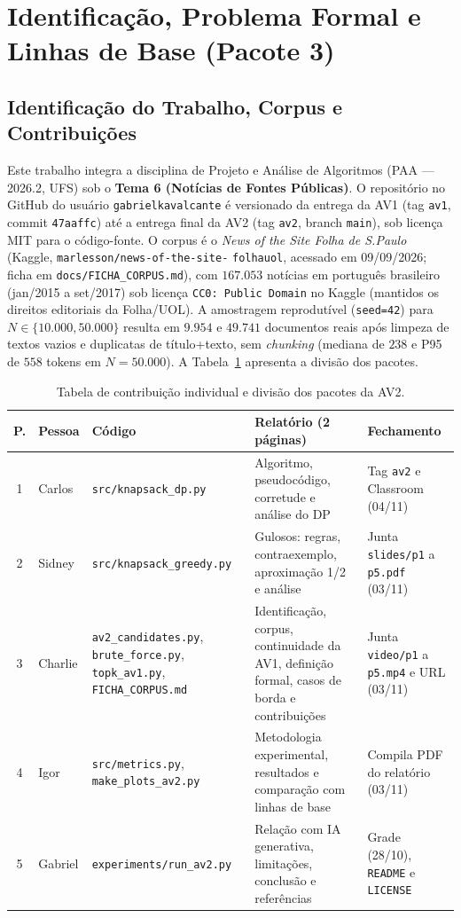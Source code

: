 \section{Identificação, Problema Formal e Linhas de Base (Pacote 3)}
\label{sec:pacote3}

\subsection{Identificação do Trabalho, Corpus e Contribuições}
Este trabalho integra a disciplina de Projeto e Análise de Algoritmos (PAA --- 2026.2, UFS) sob o \textbf{Tema 6 (Notícias de Fontes Públicas)}. O repositório no GitHub do usuário \texttt{gabrielkavalcante} é versionado da entrega da AV1 (tag \texttt{av1}, commit \texttt{47aaffc}) até a entrega final da AV2 (tag \texttt{av2}, branch \texttt{main}), sob licença MIT para o código-fonte. O corpus é o \emph{News of the Site Folha de S.Paulo} (Kaggle, \texttt{marlesson/news-of-the-site-} \texttt{folhauol}, acessado em 09/09/2026; ficha em \texttt{docs/FICHA\_CORPUS.md}), com $167.053$ notícias em português brasileiro (jan/2015 a set/2017) sob licença \texttt{CC0: Public Domain} no Kaggle (mantidos os direitos editoriais da Folha/UOL). A amostragem reprodutível (\texttt{seed=42}) para $N \in \{10.000, 50.000\}$ resulta em $9.954$ e $49.741$ documentos reais após limpeza de textos vazios e duplicatas de título+texto, sem \emph{chunking} (mediana de $238$ e P95 de $558$ tokens em $N=50.000$). A Tabela~\ref{tab:contribuicoes_av2} apresenta a divisão dos pacotes.

\begin{table}[h]
\centering
\scriptsize
\caption{Tabela de contribuição individual e divisão dos pacotes da AV2.}
\label{tab:contribuicoes_av2}
\begin{tabular}{clp{3.6cm}p{4.4cm}p{2.6cm}}
\toprule
\textbf{P.} & \textbf{Pessoa} & \textbf{Código} & \textbf{Relatório (2 páginas)} & \textbf{Fechamento} \\
\midrule
1 & Carlos & \texttt{src/knapsack\_dp.py} & Algoritmo, pseudocódigo, corretude e análise do DP & Tag \texttt{av2} e Classroom (04/11) \\
2 & Sidney & \texttt{src/knapsack\_greedy.py} & Gulosos: regras, contraexemplo, aproximação 1/2 e análise & Junta \texttt{slides/p1} a \texttt{p5.pdf} (03/11) \\
3 & Charlie & \texttt{av2\_candidates.py}, \texttt{brute\_force.py}, \texttt{topk\_av1.py}, \texttt{FICHA\_CORPUS.md} & Identificação, corpus, continuidade da AV1, definição formal, casos de borda e contribuições & Junta \texttt{video/p1} a \texttt{p5.mp4} e URL (03/11) \\
4 & Igor & \texttt{src/metrics.py}, \texttt{make\_plots\_av2.py} & Metodologia experimental, resultados e comparação com linhas de base & Compila PDF do relatório (03/11) \\
5 & Gabriel & \texttt{experiments/run\_av2.py} & Relação com IA generativa, limitações, conclusão e referências & Grade (28/10), \texttt{README} e \texttt{LICENSE} \\
\bottomrule
\end{tabular}
\end{table}

